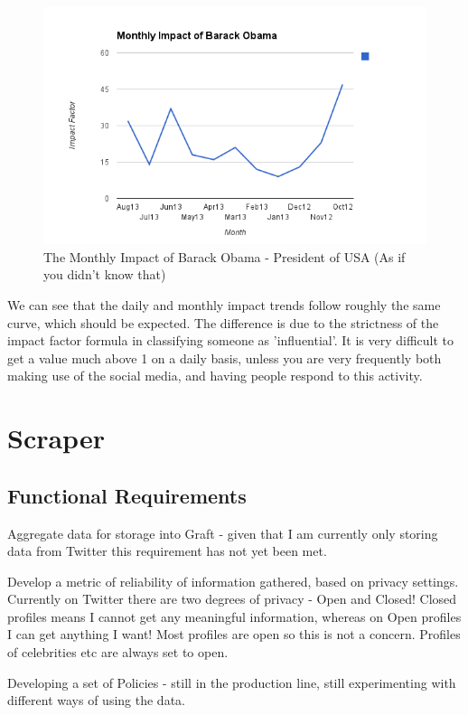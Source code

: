 \begin{figure}[h!]
\centering
\includegraphics{Images/monthly_impact_barack_obama.png}
\caption{The Monthly Impact of Barack Obama - President of USA (As if you didn't know that)}
\end{figure}

We can see that the daily and monthly impact trends follow roughly the same curve, which should be expected. The difference is due to the strictness of the impact factor formula in classifying someone as 'influential'. It is very difficult to get a value much above 1 on a daily basis, unless you are very frequently both making use of the social media, and having people respond to this activity. 

\section{Scraper}

\subsection{Functional Requirements}

Aggregate data for storage into Graft - given that I am currently only storing data from Twitter this requirement has not yet been met.

Develop a metric of reliability of information gathered, based on privacy settings. Currently on Twitter there are two degrees of privacy - Open and Closed! Closed profiles means I cannot get any meaningful information, whereas on Open profiles I can get anything I want! Most profiles are open so this is not a concern. Profiles of celebrities etc are always set to open.

Developing a set of Policies - still in the production line, still experimenting with different ways of using the data.